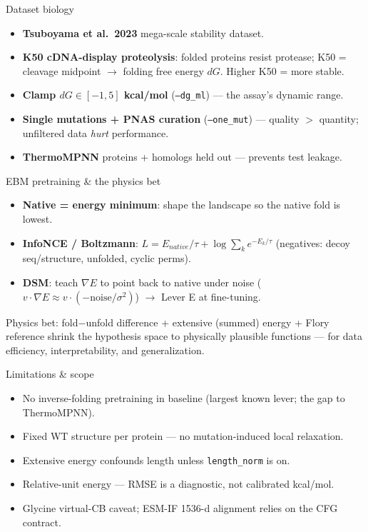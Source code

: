 \documentclass[aspectratio=169]{beamer}
\begin{document}
\begin{frame}{Dataset biology}
  \small
  \begin{itemize}
    \item \textbf{Tsuboyama et al.\ 2023} mega-scale stability dataset.
    \item \textbf{K50 cDNA-display proteolysis}: folded proteins resist protease; K50 = cleavage
          midpoint $\to$ folding free energy $dG$. Higher K50 = more stable.
    \item \textbf{Clamp $dG\in[-1,5]$ kcal/mol} (\texttt{--dg\_ml}) — the assay's dynamic range.
    \item \textbf{Single mutations + PNAS curation} (\texttt{--one\_mut}) — quality $>$ quantity;
          unfiltered data \emph{hurt} performance.
    \item \textbf{ThermoMPNN} proteins + homologs held out — prevents test leakage.
  \end{itemize}
\end{frame}

\begin{frame}{EBM pretraining \& the physics bet}
  \small
  \begin{itemize}
    \item \textbf{Native = energy minimum}: shape the landscape so the native fold is lowest.
    \item \textbf{InfoNCE / Boltzmann}: $L = E_{native}/\tau + \log\sum_k e^{-E_k/\tau}$
          (negatives: decoy seq/structure, unfolded, cyclic perms).
    \item \textbf{DSM}: teach $\nabla E$ to point back to native under noise
          ($v\cdot\nabla E \approx v\cdot(-\text{noise}/\sigma^2)$) $\to$ Lever E at fine-tuning.
  \end{itemize}
  \vspace{0.4em}
  \footnotesize Physics bet: fold$-$unfold difference + extensive (summed) energy + Flory reference
  shrink the hypothesis space to physically plausible functions — for data efficiency,
  interpretability, and generalization.
\end{frame}

\begin{frame}{Limitations \& scope}
  \small
  \begin{itemize}
    \item No inverse-folding pretraining in baseline (largest known lever; the gap to ThermoMPNN).
    \item Fixed WT structure per protein — no mutation-induced local relaxation.
    \item Extensive energy confounds length unless \texttt{length\_norm} is on.
    \item Relative-unit energy — RMSE is a diagnostic, not calibrated kcal/mol.
    \item Glycine virtual-CB caveat; ESM-IF 1536-d alignment relies on the CFG contract.
  \end{itemize}
\end{frame}
\end{document}
